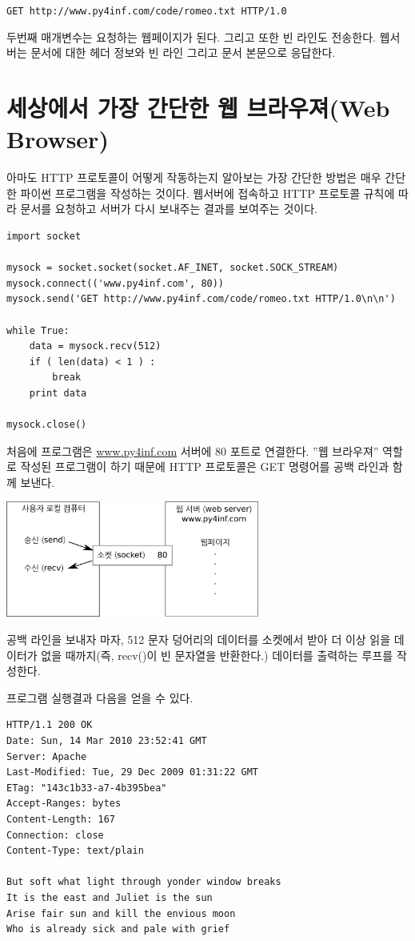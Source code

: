 {\tt GET http://www.py4inf.com/code/romeo.txt HTTP/1.0 }

두번째 매개변수는 요청하는 웹페이지가 된다. 
그리고 또한 빈 라인도 전송한다. 
웹서버는 문서에 대한 헤더 정보와 빈 라인 그리고 문서 본문으로 응답한다.


\section{세상에서 가장 간단한 웹 브라우져(Web Browser)}
아마도 HTTP 프로토콜이 어떻게 작동하는지 알아보는 가장 간단한 방법은 매우 간단한 파이썬 프로그램을 작성하는 것이다.
웹서버에 접속하고 HTTP 프로토콜 규칙에 따라 문서를 요청하고 서버가 다시 보내주는 결과를 보여주는 것이다.

\beforeverb
\begin{verbatim}
import socket

mysock = socket.socket(socket.AF_INET, socket.SOCK_STREAM)
mysock.connect(('www.py4inf.com', 80))
mysock.send('GET http://www.py4inf.com/code/romeo.txt HTTP/1.0\n\n')

while True:
    data = mysock.recv(512)
    if ( len(data) < 1 ) :
        break
    print data

mysock.close()
\end{verbatim}
\afterverb
%

처음에 프로그램은 \url{www.py4inf.com} 서버에 80 포트로 연결한다.
''웹 브라우져'' 역할로 작성된 프로그램이 하기 때문에 HTTP 프로토콜은 GET 명령어를 공백 라인과 함께 보낸다.

\beforefig
\centerline{\includegraphics[height=1.50in]{figs2/socket.eps}}
\afterfig

공백 라인을 보내자 마자, 512 문자 덩어리의 데이터를 소켓에서 받아 더 이상 읽을 데이터가 없을 때까지(즉, recv()이 빈 문자열을 반환한다.) 데이터를 출력하는 루프를 작성한다.

프로그램 실행결과 다음을 얻을 수 있다.

\beforeverb
\begin{verbatim}
HTTP/1.1 200 OK
Date: Sun, 14 Mar 2010 23:52:41 GMT
Server: Apache
Last-Modified: Tue, 29 Dec 2009 01:31:22 GMT
ETag: "143c1b33-a7-4b395bea"
Accept-Ranges: bytes
Content-Length: 167
Connection: close
Content-Type: text/plain

But soft what light through yonder window breaks
It is the east and Juliet is the sun
Arise fair sun and kill the envious moon
Who is already sick and pale with grief
\end{verbatim}
\afterverb
%


